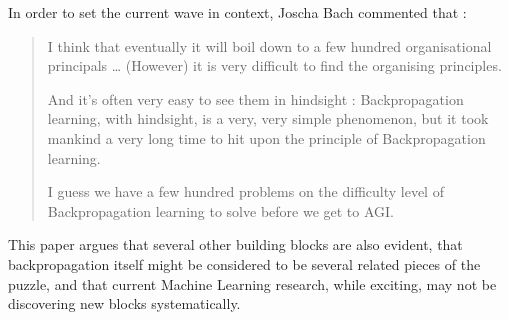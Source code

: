 \documentclass[citeauthoryear]{llncs}
\begin{document}
In order to set the current wave in context, Joscha Bach \cite{Joscha-Bach-2012-interview}
commented that :

\begin{quotation}

I think that eventually it will boil down to a few hundred organisational principals
\dots
%
%
%
(However) it is very difficult to find the organising principles.

And it's often very easy to see them in hindsight : 
Backpropagation learning, with hindsight, is a very, very simple phenomenon, 
but it took mankind a very long time to hit upon the principle of Backpropagation learning. 

I guess we have a few hundred problems on the difficulty level of Backpropagation learning to solve before we get to AGI. 


\end{quotation}

This paper argues that several other building blocks are also evident, 
that backpropagation itself might be considered to be several related pieces of the puzzle,
and that current Machine Learning research, while exciting, may not be
discovering new blocks systematically.
\end{document}
